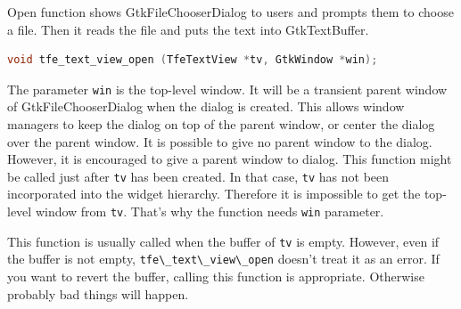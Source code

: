 Open function shows GtkFileChooserDialog to users and prompts them to
choose a file. Then it reads the file and puts the text into
GtkTextBuffer.

\begin{lstlisting}[language=C]
void tfe_text_view_open (TfeTextView *tv, GtkWindow *win);
\end{lstlisting}

The parameter \passthrough{\lstinline!win!} is the top-level window. It
will be a transient parent window of GtkFileChooserDialog when the
dialog is created. This allows window managers to keep the dialog on top
of the parent window, or center the dialog over the parent window. It is
possible to give no parent window to the dialog. However, it is
encouraged to give a parent window to dialog. This function might be
called just after \passthrough{\lstinline!tv!} has been created. In that
case, \passthrough{\lstinline!tv!} has not been incorporated into the
widget hierarchy. Therefore it is impossible to get the top-level window
from \passthrough{\lstinline!tv!}. That's why the function needs
\passthrough{\lstinline!win!} parameter.

This function is usually called when the buffer of
\passthrough{\lstinline!tv!} is empty. However, even if the buffer is
not empty, \passthrough{\lstinline!tfe\_text\_view\_open!} doesn't treat
it as an error. If you want to revert the buffer, calling this function
is appropriate. Otherwise probably bad things will happen.

